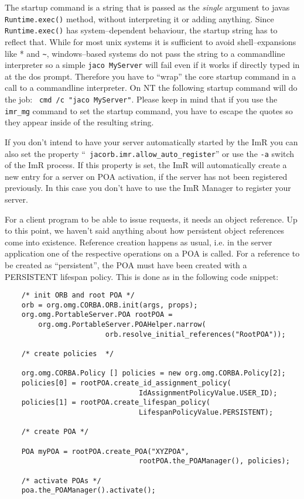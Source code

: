 The startup  command is a  string that is  passed as the  {\em single}
argument to javas {\tt Runtime.exec()} method, without interpreting it
or adding  anything. Since {\tt  Runtime.exec()} has system--dependent
behaviour, the startup string has to reflect that. While for most unix
systems  it  is  sufficient  to  avoid shell--expansions  like  *  and
\verb+~+,  windows--based  systems  do   not  pass  the  string  to  a
commandline interpreter so a simple {\tt jaco MyServer} will fail even
if it works if directly typed in at the dos prompt. Therefore you have
to  ``wrap'' the  core  startup command  in  a call  to a  commandline
interpreter. On NT the following startup command will do the job: {\tt
cmd /c "jaco MyServer"}.  Please keep in mind that if you use the {\tt
imr\_mg} command  to set the startup  command, you have  to escape the
quotes so they appear inside of the resulting string.

If you don't  intend to have your server  automatically started by the
ImR     you      can     also     set      the     property     ``{\tt
jacorb.imr.allow\_auto\_register}'' or use the  {\tt -a} switch of the
ImR  process. If  this property  is  set, the  ImR will  automatically
create a new  entry for a server on POA activation,  if the server has
not been registered previously. In this case you don't have to use the
ImR Manager to register your server.

For a client program to be  able to issue requests, it needs an object
reference.  Up to  this  point,  we haven't  said  anything about  how
persistent object  references come into  existence. Reference creation
happens as usual, i.e. in the server application one of the respective
operations  on a  POA is  called.  For a  reference to  be created  as
``persistent'',  the POA  must  have been  created  with a  PERSISTENT
lifespan policy. This is done as in the following code snippet:

\small{
\begin{verbatim}
    /* init ORB and root POA */
    orb = org.omg.CORBA.ORB.init(args, props);
    org.omg.PortableServer.POA rootPOA =
        org.omg.PortableServer.POAHelper.narrow(
                        orb.resolve_initial_references("RootPOA"));

    /* create policies  */

    org.omg.CORBA.Policy [] policies = new org.omg.CORBA.Policy[2];
    policies[0] = rootPOA.create_id_assignment_policy(
                                IdAssignmentPolicyValue.USER_ID);
    policies[1] = rootPOA.create_lifespan_policy(
                                LifespanPolicyValue.PERSISTENT);

    /* create POA */

    POA myPOA = rootPOA.create_POA("XYZPOA",
                                rootPOA.the_POAManager(), policies);

    /* activate POAs */
    poa.the_POAManager().activate();

\end{verbatim}
}

